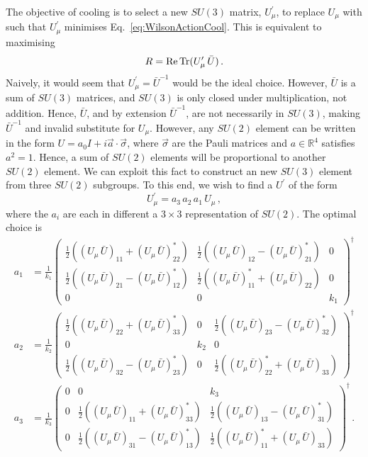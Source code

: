 The objective of cooling is to select a new $SU(3)$ matrix, $U_\mu^\prime$, to replace $U_\mu$ with such that $U_\mu^\prime$ minimises Eq.~\eqref{eq:WilsonActionCool}. This is equivalent to maximising
%
\begin{equation}
R = \operatorname{Re} \operatorname{Tr} (U_\mu^\prime \, \bar{U})\, .
\label{eq:CoolFunctional}
\end{equation}
%
Naively, it would seem that $U_\mu^\prime = \bar{U}^{-1}$ would be the ideal choice. However, $\bar{U}$ is a sum of $SU(3)$ matrices, and $SU(3)$ is only closed under multiplication, not addition. Hence, $\bar{U}$, and by extension $\bar{U}^{-1}$, are not necessarily in $SU(3)$, making $\bar{U}^{-1}$ and invalid substitute for $U_\mu$. However, any $SU(2)$ element can be written in the form $U = a _ { 0 } I + i \vec { a } \cdot \vec { \sigma }$, where $\vec{\sigma}$ are the Pauli matrices and $a\in\mathbb{R}^4$  satisfies $a^2=1$. Hence, a sum of $SU(2)$ elements will be proportional to another $SU(2)$ element. We can exploit this fact to construct an new $SU(3)$ element from three $SU(2)$ subgroups. To this end, we wish to find a $U^\prime$ of the form
%
\begin{equation}
U^\prime_\mu = a_3\,a_2\,a_1\,U_\mu\, ,
\label{eq:UPrime}
\end{equation}
%
where the $a_i$ are each in different a $3\times 3$ representation of $SU(2)$. The optimal choice is
%
\begin{align*}
a_1 &= \frac{1}{k_1}
\begin{pmatrix}
\frac{1}{2}\left((U_\mu \, \bar{U})_{11} + (U_\mu \, \bar{U})^*_{22}\right) & \frac{1}{2}\left((U_\mu \, \bar{U})_{12} - (U_\mu \, \bar{U})^*_{21}\right) & 0\\
\frac{1}{2}\left((U_\mu \, \bar{U})_{21} - (U_\mu \, \bar{U})^*_{12}\right) & \frac{1}{2}\left((U_\mu \, \bar{U})^*_{11} + (U_\mu \, \bar{U})_{22}\right) & 0\\
0 & 0 & k_1
\end{pmatrix}^\dagger\\
a_2 &= \frac{1}{k_2}
\begin{pmatrix}
\frac{1}{2}\left((U_\mu \, \bar{U})_{22} + (U_\mu \, \bar{U})^*_{33}\right) & 0 & \frac{1}{2}\left((U_\mu \, \bar{U})_{23} - (U_\mu \, \bar{U})^*_{32}\right)\\
0 & k_2 & 0\\
\frac{1}{2}\left((U_\mu \, \bar{U})_{32} - (U_\mu \, \bar{U})^*_{23}\right) & 0 & \frac{1}{2}\left((U_\mu \, \bar{U})^*_{22} + (U_\mu \, \bar{U})_{33}\right)
\end{pmatrix}^\dagger\\
a_3 &= \frac{1}{k_3}
\begin{pmatrix}
0 & 0 & k_3\\
0 & \frac{1}{2}\left((U_\mu \, \bar{U})_{11} + (U_\mu \, \bar{U})^*_{33}\right) & \frac{1}{2}\left((U_\mu \, \bar{U})_{13} - (U_\mu \, \bar{U})^*_{31}\right)\\
0 & \frac{1}{2}\left((U_\mu \, \bar{U})_{31} - (U_\mu \, \bar{U})^*_{13}\right) & \frac{1}{2}\left((U_\mu \, \bar{U})^*_{11} + (U_\mu \, \bar{U})_{33}\right)
\end{pmatrix}^\dagger\, .
\end{align*}
